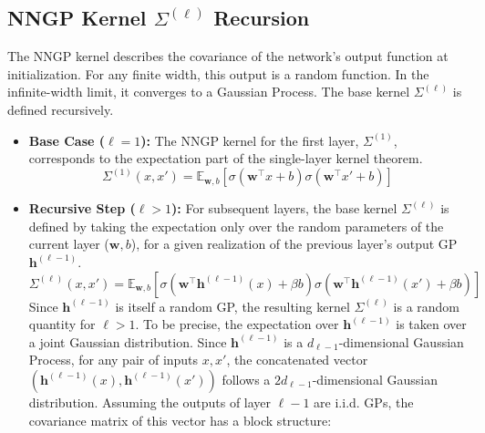 \documentclass[a4paper]{article}
\begin{document}
\subsection{NNGP Kernel \(\Sigma^{(\ell)}\) Recursion}
The NNGP kernel describes the covariance of the network's output function at initialization. For any finite width, this output is a random function. In the infinite-width limit, it converges to a Gaussian Process. The base kernel $\Sigma^{(\ell)}$ is defined recursively.
\begin{itemize}
    \item \textbf{Base Case (\(\ell=1\)):} The NNGP kernel for the first layer, $\Sigma^{(1)}$, corresponds to the expectation part of the single-layer kernel theorem.
    \begin{equation}
        \Sigma^{(1)}(x, x') = \mathbb{E}_{\bm{w},b}\left[\sigma(\bm{w}^\top x + b)\sigma(\bm{w}^\top x' + b)\right]
    \end{equation}
    
    \item \textbf{Recursive Step (\(\ell > 1\)):} For subsequent layers, the base kernel $\Sigma^{(\ell)}$ is defined by taking the expectation only over the random parameters of the current layer ($\bm{w}, b$), for a given realization of the previous layer's output GP $\bm{h}^{(\ell-1)}$.
    \begin{equation}
        \Sigma^{(\ell)}(x, x') = \mathbb{E}_{\bm{w}, b} \left[ \sigma\left(\bm{w}^\top \bm{h}^{(\ell-1)}(x) + \beta b\right) \sigma\left(\bm{w}^\top \bm{h}^{(\ell-1)}(x') + \beta b\right) \right]
    \end{equation}
    Since $\bm{h}^{(\ell-1)}$ is itself a random GP, the resulting kernel $\Sigma^{(\ell)}$ is a random quantity for $\ell > 1$.
    To be precise, the expectation over $\bm{h}^{(\ell-1)}$ is taken over a joint Gaussian distribution. Since $\bm{h}^{(\ell-1)}$ is a $d_{\ell-1}$-dimensional Gaussian Process, for any pair of inputs $x, x'$, the concatenated vector $(\bm{h}^{(\ell-1)}(x), \bm{h}^{(\ell-1)}(x'))$ follows a $2d_{\ell-1}$-dimensional Gaussian distribution. Assuming the outputs of layer $\ell-1$ are i.i.d. GPs, the covariance matrix of this vector has a block structure:
\end{itemize}
\end{document}
